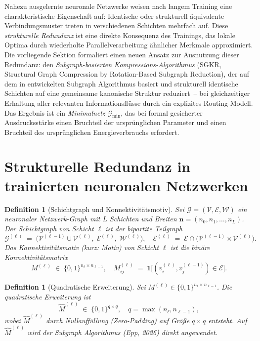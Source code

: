 \documentclass[12pt, a4paper, openany]{report}
\newtheorem{definition}[theorem]{Definition}
\newcommand{\calG}{\mathcal{G}}
\newcommand{\calV}{\mathcal{V}}
\newcommand{\calE}{\mathcal{E}}
\newcommand{\calW}{\mathcal{W}}
\begin{document}
Nahezu ausgelernte neuronale Netzwerke weisen nach langem Training eine
charakteristische Eigenschaft auf: Identische oder strukturell äquivalente
Verbindungsmuster treten in verschiedenen Schichten mehrfach auf.  Diese
\emph{strukturelle Redundanz} ist eine direkte Konsequenz des Trainings,
das lokale Optima durch wiederholte Parallelverarbeitung ähnlicher Merkmale
approximiert.  Die vorliegende Sektion formaliert einen neuen Ansatz zur
Ausnutzung dieser Redundanz: den \emph{Subgraph-basierten
Kompressions-Algorithmus} (SGKR, Structural Graph Compression by
Rotation-Based Subgraph Reduction), der auf dem in \cite{epp2026subgraph} entwickelten
Subgraph Algorithmus basiert und strukturell identische Schichten auf eine
gemeinsame kanonische Struktur reduziert~-- bei gleichzeitiger Erhaltung
aller relevanten Informationsflüsse durch ein explizites Routing-Modell.
Das Ergebnis ist ein \emph{Minimal\-netz} $\calG_{\min}$, das bei
formal gesicherter Ausdrucksstärke einen Bruchteil der ursprünglichen
Parameter und einen Bruchteil des ursprünglichen Energieverbrauchs erfordert.

\section{Strukturelle Redundanz in trainierten neuronalen Netzwerken}
\label{sec:sgkr_motivation}

\begin{definition}[Schichtgraph und Konnektivitätsmotiv]
\label{def:layer_motif}
Sei $\calG = (\calV, \calE, \calW)$ ein neuronaler Netzwerk-Graph mit
$L$ Schichten und Breiten $\bm{n} = (n_0, n_1, \ldots, n_L)$.  Der
\emph{Schichtgraph} von Schicht $\ell$ ist der bipartite Teilgraph
\[
  \calG^{(\ell)}
  \;=\;
  \bigl(\calV^{(\ell-1)} \cup \calV^{(\ell)},\;
        \calE^{(\ell)},\;
        \calW^{(\ell)}\bigr),
  \quad
  \calE^{(\ell)} \;=\; \calE \cap \bigl(\calV^{(\ell-1)} \times \calV^{(\ell)}\bigr).
\]
Das \emph{Konnektivitätsmotiv} (kurz: \emph{Motiv}) von Schicht $\ell$ ist
die binäre Konnektivitäts\-matrix
\[
  M^{(\ell)} \;\in\; \{0,1\}^{n_\ell \times n_{\ell-1}},
  \quad
  M^{(\ell)}_{ij} \;=\; \mathbf{1}\bigl[(v_i^{(\ell)}, v_j^{(\ell-1)}) \in \calE\bigr].
\]
\end{definition}

\begin{definition}[Quadratische Erweiterung]
\label{def:square_motif}
Sei $M^{(\ell)} \in \{0,1\}^{n_\ell \times n_{\ell-1}}$.  Die
\emph{quadratische Erweiterung} ist
\[
  \hat{M}^{(\ell)} \;\in\; \{0,1\}^{q \times q},
  \quad q = \max(n_\ell, n_{\ell-1}),
\]
wobei $\hat{M}^{(\ell)}$ durch Nullauffüllung (Zero-Padding) auf Größe
$q \times q$ entsteht.  Auf $\hat{M}^{(\ell)}$ wird der Subgraph Algorithmus
(Epp, 2026) direkt angewendet.
\end{definition}
\end{document}
